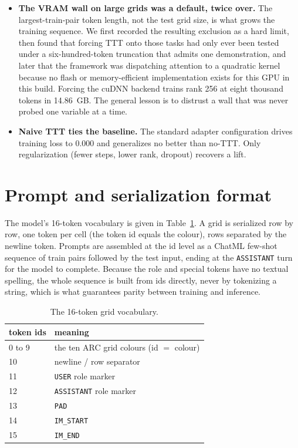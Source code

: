 \documentclass[11pt]{article}
\begin{document}
\begin{itemize}[leftmargin=1.4em,itemsep=3pt]
validation scripts that drove generation through eager had no per-task timeout, so one big-grid task could
hang a whole multi-hour run with no way to resume. Moving validation onto the same \texttt{llama-server}
path used for scoring, with a hard per-request cap, a heartbeat file, and per-task checkpoints, removed the
stalls and made the runs resumable. The engine was the bottleneck for validation just as for inference.
\item \textbf{The VRAM wall on large grids was a default, twice over.} The largest-train-pair token
length, not the test grid size, is what grows the training sequence. We first recorded the resulting
exclusion as a hard limit, then found that forcing TTT onto those tasks had only ever been tested under a
six-hundred-token truncation that admits one demonstration, and later that the framework was dispatching
attention to a quadratic kernel because no flash or memory-efficient implementation exists for this GPU in
this build. Forcing the cuDNN backend trains rank 256 at eight thousand tokens in 14.86~GB. The general
lesson is to distrust a wall that was never probed one variable at a time.
\item \textbf{Naive TTT ties the baseline.} The standard adapter configuration drives training loss
to $0.000$ and generalizes no better than no-TTT. Only regularization (fewer steps, lower rank,
dropout) recovers a lift.
\end{itemize}

\section{Prompt and serialization format}
\label{app:format}
The model's 16-token vocabulary is given in Table~\ref{tab:vocab}. A grid is serialized row by row,
one token per cell (the token id equals the colour), rows separated by the newline token. Prompts are
assembled at the id level as a ChatML few-shot sequence of train pairs followed by the test input,
ending at the \texttt{ASSISTANT} turn for the model to complete. Because the role and special tokens
have no textual spelling, the whole sequence is built from ids directly, never by tokenizing a
string, which is what guarantees parity between training and inference.

\begin{table}[H]
\centering
\caption{The 16-token grid vocabulary.}
\label{tab:vocab}
\begin{tabular}{ll}
\toprule
token ids & meaning \\
\midrule
0 to 9 & the ten ARC grid colours (id $=$ colour) \\
10   & newline / row separator \\
11   & \texttt{USER} role marker \\
12   & \texttt{ASSISTANT} role marker \\
13   & \texttt{PAD} \\
14   & \texttt{IM\_START} \\
15   & \texttt{IM\_END} \\
\bottomrule
\end{tabular}
\end{table}
\end{document}
